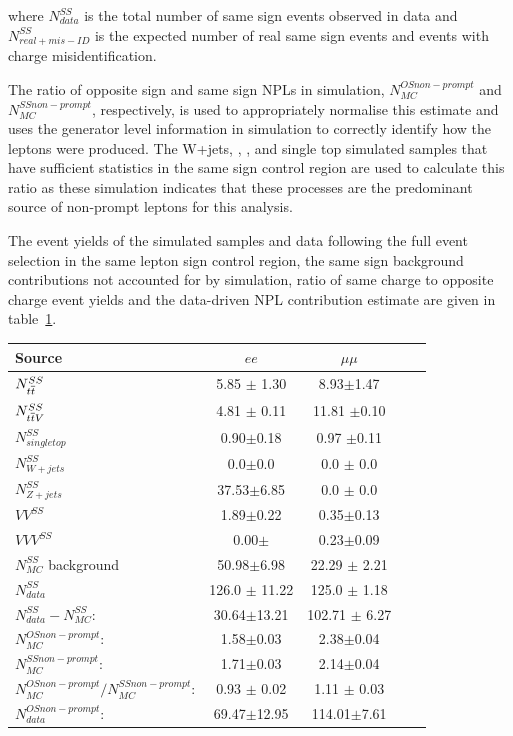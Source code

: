 where $N_{data}^{SS}$ is the total number of same sign events observed in data and $N^{SS}_{real + mis-ID}$ is the expected number of real same sign events and events with charge misidentification.

The ratio of opposite sign and same sign NPLs in simulation, $N_{MC}^{OS non-prompt}$ and $N_{MC}^{SS non-prompt}$, respectively, is used to appropriately normalise this estimate and uses the generator level information in simulation to correctly identify how the leptons were produced.
The W+jets, \ttZ, \ttW, and single top simulated samples that have sufficient statistics in the same sign control region are used to calculate this ratio as these simulation indicates that these processes are the predominant source of non-prompt leptons for this analysis.

The event yields of the simulated samples and data following the full event selection in the same lepton sign control region, the same sign background contributions not accounted for by simulation, ratio of same charge to opposite charge event yields and the data-driven NPL contribution estimate are given in table~\ref{tab:fakeLeptonYields}.

\begin{table}[htbp]
\centering
\begin{tabular}{l | cccc}
\hline
Source &  $ee$ & $\mu\mu$  \\ 
\hline
$N_{t\overline{t}}^{SS}$ & 5.85 $\pm$ 1.30 & 8.93$\pm$1.47    \\
$N_{t\overline{t} V}^{SS}$ & 4.81 $\pm$ 0.11 & 11.81 $\pm$0.10  \\ 
$N_{single top}^{SS}$ & 0.90$\pm$0.18 & 0.97 $\pm$0.11    \\
$N_{W+jets}^{SS}$ & 0.0$\pm$0.0 & 0.0 $\pm$ 0.0  \\
$N_{Z+jets}^{SS}$ & 37.53$\pm$6.85 & 0.0 $\pm$ 0.0  \\
$VV^{SS}$ & 1.89$\pm$0.22 & 0.35$\pm$0.13 \\
$VVV^{SS}$ & 0.00$\pm$ & 0.23$\pm$0.09 \\
\hline
$N_{MC}^{SS}$ background & 50.98$\pm$6.98 & 22.29 $\pm$ 2.21 \\ 
$N_{data}^{SS}$ & 126.0 $\pm$ 11.22 & 125.0 $\pm$ 1.18\\ 
\hline
$N_{data}^{SS} - N_{MC}^{SS}$: & 30.64$\pm$13.21 & 102.71 $\pm$ 6.27\\
\hline
$N_{MC}^{OS non-prompt}$: & 1.58$\pm$0.03 & 2.38$\pm$0.04 \\
$N_{MC}^{SS non-prompt}$: & 1.71$\pm$0.03 & 2.14$\pm$0.04 \\
$N_{MC}^{OS non-prompt}/N_{MC}^{SS non-prompt}$: & 0.93 $\pm$ 0.02 & 1.11 $\pm$ 0.03 \\
\hline
$N_{data}^{OS non-prompt}$: & 69.47$\pm$12.95 & 114.01$\pm$7.61 \\
\hline
\end{tabular}
\label{tab:fakeLeptonYields}
\end{table}

